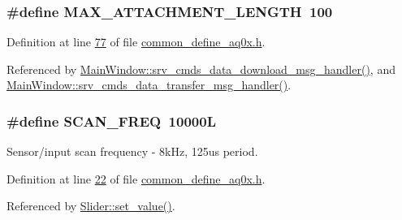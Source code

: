 \hypertarget{a00031_aa8abe3a822c64813f7aaba3ca7e3db9c}{
\subsubsection[{M\+A\+X\+\_\+\+A\+T\+T\+A\+C\+H\+M\+E\+N\+T\+\_\+\+L\+E\+N\+G\+T\+H}]{\setlength{\rightskip}{0pt plus 5cm}\#define M\+A\+X\+\_\+\+A\+T\+T\+A\+C\+H\+M\+E\+N\+T\+\_\+\+L\+E\+N\+G\+T\+H~100}}\label{a00031_aa8abe3a822c64813f7aaba3ca7e3db9c}


Definition at line \hyperlink{a00031_source_l00077}{77} of file \hyperlink{a00031_source}{common\+\_\+define\+\_\+aq0x.\+h}.



Referenced by \hyperlink{a00049_source_l00588}{Main\+Window\+::srv\+\_\+cmds\+\_\+data\+\_\+download\+\_\+msg\+\_\+handler()}, and \hyperlink{a00049_source_l00437}{Main\+Window\+::srv\+\_\+cmds\+\_\+data\+\_\+transfer\+\_\+msg\+\_\+handler()}.

\hypertarget{a00031_a8127170b687c1f67a968886c128e76e4}{
\subsubsection[{S\+C\+A\+N\+\_\+\+F\+R\+E\+Q}]{\setlength{\rightskip}{0pt plus 5cm}\#define S\+C\+A\+N\+\_\+\+F\+R\+E\+Q~10000\+L}}\label{a00031_a8127170b687c1f67a968886c128e76e4}


Sensor/input scan frequency -\/ 8k\+Hz, 125us period. 



Definition at line \hyperlink{a00031_source_l00022}{22} of file \hyperlink{a00031_source}{common\+\_\+define\+\_\+aq0x.\+h}.



Referenced by \hyperlink{a00046_source_l00102}{Slider\+::set\+\_\+value()}.

